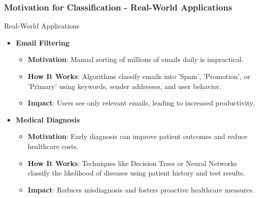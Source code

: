\documentclass[aspectratio=169]{beamer}
\begin{document}
\begin{frame}[fragile]
    \frametitle{Motivation for Classification - Real-World Applications}
    \begin{block}{Real-World Applications}
        \begin{itemize}
            \item \textbf{Email Filtering}
                \begin{itemize}
                    \item \textbf{Motivation}: Manual sorting of millions of emails daily is impractical.
                    \item \textbf{How It Works}: Algorithms classify emails into 'Spam', 'Promotion', or 'Primary' using keywords, sender addresses, and user behavior.
                    \item \textbf{Impact}: Users see only relevant emails, leading to increased productivity.
                \end{itemize}
                
            \item \textbf{Medical Diagnosis}
                \begin{itemize}
                    \item \textbf{Motivation}: Early diagnosis can improve patient outcomes and reduce healthcare costs.
                    \item \textbf{How It Works}: Techniques like Decision Trees or Neural Networks classify the likelihood of diseases using patient history and test results.
                    \item \textbf{Impact}: Reduces misdiagnosis and fosters proactive healthcare measures.
                \end{itemize}
        \end{itemize}
    \end{block}
\end{frame}
\end{document}

